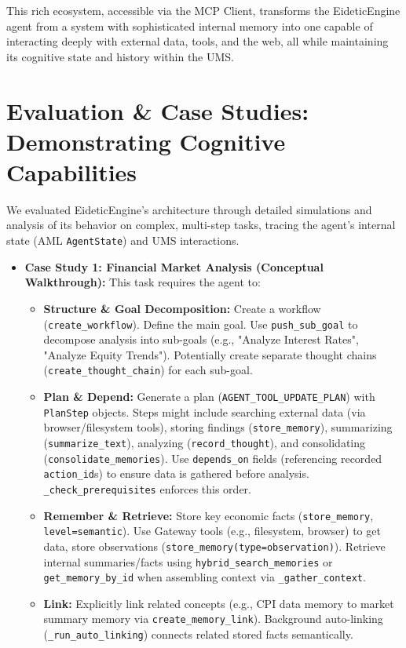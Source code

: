 \documentclass[12pt,a4paper]{article}
\newcommand{\code}[1]{\nolinkurl{#1}}
\begin{document}
This rich ecosystem, accessible via the MCP Client, transforms the EideticEngine agent from a system with sophisticated internal memory into one capable of interacting deeply with external data, tools, and the web, all while maintaining its cognitive state and history within the UMS.

\section{Evaluation \& Case Studies: Demonstrating Cognitive Capabilities}

We evaluated EideticEngine's architecture through detailed simulations and analysis of its behavior on complex, multi-step tasks, tracing the agent's internal state (AML \code{AgentState}) and UMS interactions.

\begin{itemize}
    \item \textbf{Case Study 1: Financial Market Analysis (Conceptual Walkthrough):} This task requires the agent to:
    \begin{itemize}
        \item \textbf{Structure \& Goal Decomposition:} Create a workflow (\code{create\_workflow}). Define the main goal. Use \code{push\_sub\_goal} to decompose analysis into sub-goals (e.g., "Analyze Interest Rates", "Analyze Equity Trends"). Potentially create separate thought chains (\code{create\_thought\_chain}) for each sub-goal.
        \item \textbf{Plan \& Depend:} Generate a plan (\code{AGENT\_TOOL\_UPDATE\_PLAN}) with \code{PlanStep} objects. Steps might include searching external data (via browser/filesystem tools), storing findings (\code{store\_memory}), summarizing (\code{summarize\_text}), analyzing (\code{record\_thought}), and consolidating (\code{consolidate\_memories}). Use \code{depends\_on} fields (referencing recorded \code{action\_id}s) to ensure data is gathered before analysis. \code{\_check\_prerequisites} enforces this order.
        \item \textbf{Remember \& Retrieve:} Store key economic facts (\code{store\_memory}, \code{level=semantic}). Use Gateway tools (e.g., filesystem, browser) to get data, store observations (\code{store\_memory(type=observation)}). Retrieve internal summaries/facts using \code{hybrid\_search\_memories} or \code{get\_memory\_by\_id} when assembling context via \code{\_gather\_context}.
        \item \textbf{Link:} Explicitly link related concepts (e.g., CPI data memory to market summary memory via \code{create\_memory\_link}). Background auto-linking (\code{\_run\_auto\_linking}) connects related stored facts semantically.

\end{itemize}
\end{itemize}
\end{document}
